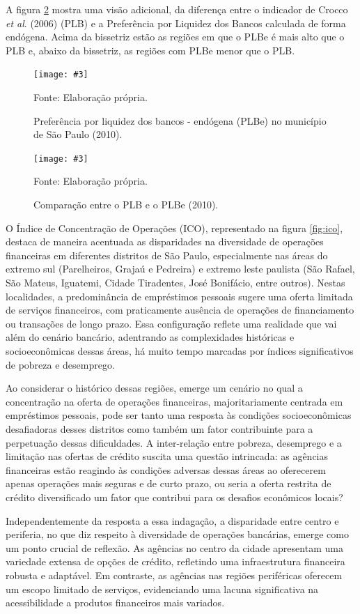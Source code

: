 \documentclass[a4paper,12pt]{article}
\newcommand{\fig}[4]{%
  \begin{figure}[H]
    \centering
    \caption{#1}
    \label{#2}
    \texttt{[image: \#3]}
    
    \vspace{0.5cm}
    
    \begin{footnotesize}
      Fonte: #4
    \end{footnotesize}
  \end{figure}
}
\begin{document}
A figura \ref{fig:plbxplbe} mostra uma visão adicional, da diferença
entre o indicador de Crocco \emph{et al}. (2006) (PLB) e a Preferência
por Liquidez dos Bancos calculada de forma endógena. Acima da bissetriz
estão as regiões em que o PLBe é mais alto que o PLB e, abaixo da
bissetriz, as regiões com PLBe menor que o PLB.

\fig{Preferência por liquidez dos bancos - endógena (PLBe) no município de São Paulo (2010).}{fig:plbe}{exports/plbe2.pdf}{Elaboração própria.}

\fig{Comparação entre o PLB e o PLBe (2010).}{fig:plbxplbe}{exports/plbXplbe.pdf}{Elaboração própria.}

O Índice de Concentração de Operações (ICO), representado na figura
\ref{fig:ico}, destaca de maneira acentuada as disparidades na
diversidade de operações financeiras em diferentes distritos de São
Paulo, especialmente nas áreas do extremo sul (Parelheiros, Grajaú e
Pedreira) e extremo leste paulista (São Rafael, São Mateus, Iguatemi,
Cidade Tiradentes, José Bonifácio, entre outros). Nestas localidades, a
predominância de empréstimos pessoais sugere uma oferta limitada de
serviços financeiros, com praticamente ausência de operações de
financiamento ou transações de longo prazo. Essa configuração reflete
uma realidade que vai além do cenário bancário, adentrando as
complexidades históricas e socioeconômicas dessas áreas, há muito tempo
marcadas por índices significativos de pobreza e desemprego.

Ao considerar o histórico dessas regiões, emerge um cenário no qual a
concentração na oferta de operações financeiras, majoritariamente
centrada em empréstimos pessoais, pode ser tanto uma resposta às
condições socioeconômicas desafiadoras desses distritos como também um
fator contribuinte para a perpetuação dessas dificuldades. A
inter-relação entre pobreza, desemprego e a limitação nas ofertas de
crédito suscita uma questão intrincada: as agências financeiras estão
reagindo às condições adversas dessas áreas ao oferecerem apenas
operações mais seguras e de curto prazo, ou seria a oferta restrita de
crédito diversificado um fator que contribui para os desafios econômicos
locais?

Independentemente da resposta a essa indagação, a disparidade entre
centro e periferia, no que diz respeito à diversidade de operações
bancárias, emerge como um ponto crucial de reflexão. As agências no
centro da cidade apresentam uma variedade extensa de opções de crédito,
refletindo uma infraestrutura financeira robusta e adaptável. Em
contraste, as agências nas regiões periféricas oferecem um escopo
limitado de serviços, evidenciando uma lacuna significativa na
acessibilidade a produtos financeiros mais variados.
\end{document}
